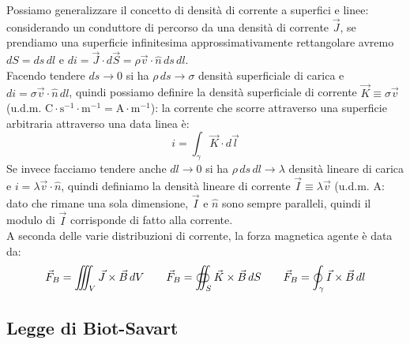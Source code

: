 \documentclass[]{article}
\begin{document}
Possiamo generalizzare il concetto di densità di corrente a superfici e linee: considerando un conduttore di percorso da una densità di corrente $ \vec{J} $, se prendiamo una superficie infinitesima approssimativamente rettangolare avremo $ dS = ds \, dl $ e $ di = \vec{J}\cdot d\vec{S} = \rho \vec{v}\cdot\hat{n} \, ds \, dl $. \\ 
%
Facendo tendere $ ds \rightarrow 0 $ si ha $ \rho \, ds \rightarrow \sigma $ densità superficiale di carica e $ di = \sigma \vec{v} \cdot \hat{n} \, dl $, quindi possiamo definire la densità superficiale di corrente $ \vec{K} \equiv \sigma\vec{v} $ (u.d.m. $ \text{C} \cdot \text{s}^{-1} \cdot \text{m}^{-1} = \text{A}  \cdot \text{m}^{-1} $): la corrente che scorre attraverso una superficie arbitraria attraverso una data linea è:
\begin{equation}
	i = \int_{\gamma} \vec{K}\cdot d\vec{l}
	\label{eq:dens-sup-corr}
\end{equation}
%
Se invece facciamo tendere anche $ dl \rightarrow 0 $ si ha $ \rho \, ds \, dl \rightarrow \lambda $ densità lineare di carica e $ i = \lambda \vec{v} \cdot \hat{n} $, quindi definiamo la densità lineare di corrente $ \vec{I} \equiv \lambda \vec{v} $ (u.d.m. $ \text{A} $: dato che rimane una sola dimensione, $ \vec{I} $ e $ \hat{n} $ sono sempre paralleli, quindi il modulo di $ \vec{I} $ corrisponde di fatto alla corrente. \\ 
%
A seconda delle varie distribuzioni di corrente, la forza magnetica agente è data da:
\begin{equation}
	\vec{F}_B = \iiint_V \vec{J}\times\vec{B} \, dV \qquad \vec{F}_B = \oiint_S \vec{K}\times\vec{B} \, dS \qquad \vec{F}_B = \oint_{\gamma} \vec{I}\times\vec{B} \, dl
	\label{eq:distr-corr}
\end{equation}

\subsection{Legge di Biot-Savart}
\end{document}
